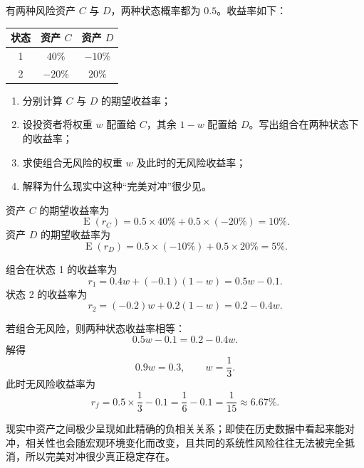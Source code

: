 \begin{question}
有两种风险资产 $C$ 与 $D$，两种状态概率都为 $0.5$。收益率如下：

\begin{center}
\begin{tabular}{c|cc}
状态 & 资产 $C$ & 资产 $D$\\ \hline
1 & $40\%$ & $-10\%$\\
2 & $-20\%$ & $20\%$
\end{tabular}
\end{center}

\begin{enumerate}[label=(\arabic*),leftmargin=2.5em]
  \item 分别计算 $C$ 与 $D$ 的期望收益率；
  \item 设投资者将权重 $w$ 配置给 $C$，其余 $1-w$ 配置给 $D$。写出组合在两种状态下的收益率；
  \item 求使组合无风险的权重 $w$ 及此时的无风险收益率；
  \item 解释为什么现实中这种“完美对冲”很少见。
\end{enumerate}

\begin{solution}
资产 $C$ 的期望收益率为
\[
\operatorname{E}(r_C)=0.5\times 40\%+0.5\times (-20\%)=10\%.
\]
资产 $D$ 的期望收益率为
\[
\operatorname{E}(r_D)=0.5\times (-10\%)+0.5\times 20\%=5\%.
\]

组合在状态 1 的收益率为
\[
r_1=0.4w+(-0.1)(1-w)=0.5w-0.1.
\]
状态 2 的收益率为
\[
r_2=(-0.2)w+0.2(1-w)=0.2-0.4w.
\]

若组合无风险，则两种状态收益率相等：
\[
0.5w-0.1=0.2-0.4w.
\]
解得
\[
0.9w=0.3,\qquad w=\frac13.
\]
此时无风险收益率为
\[
r_f=0.5\times \frac13-0.1=\frac16-0.1=\frac{1}{15}\approx 6.67\%.
\]

现实中资产之间极少呈现如此精确的负相关关系；即使在历史数据中看起来能对冲，相关性也会随宏观环境变化而改变，且共同的系统性风险往往无法被完全抵消，所以完美对冲很少真正稳定存在。
\end{solution}
\end{question}


